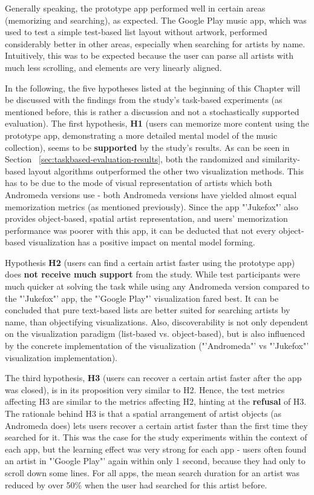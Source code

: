 Generally speaking, the prototype app performed well in certain areas (memorizing and searching), as expected. The Google Play music app, which was used to test a simple test-based list layout without artwork, performed considerably better in other areas, especially when searching for artists by name. Intuitively, this was to be expected because the user can parse all artists with much less scrolling, and elements are very linearly aligned.

In the following, the five hypotheses listed at the beginning of this Chapter will be discussed with the findings from the study's task-based experiments (as mentioned before, this is rather a discussion and not a stochastically supported evaluation).
The first hypothesis, \textbf{H1} (users can memorize more content using the prototype app, demonstrating a more detailed mental model of the music collection), seems to be \textbf{supported} by the study's results. As can be seen in Section ~\ref{sec:taskbased-evaluation-results}, both the randomized and similarity-based layout algorithms outperformed the other two visualization methods. This has to be due to the mode of visual representation of artists which both Andromeda versions use - both Andromeda versions have yielded almost equal memorization metrics (as mentioned previously). Since the app "'Jukefox"' also provides object-based, spatial artist representation, and users' memorization performance was poorer with this app, it can be deducted that not every object-based visualization has a positive impact on mental model forming.

Hypothesis \textbf{H2} (users can find a certain artist faster using the prototype app) does \textbf{not receive much support} from the study. While test participants were much quicker at solving the task while using any Andromeda version compared to the "'Jukefox"' app, the "'Google Play"' visualization fared best. It can be concluded that pure text-based lists are better suited for searching artists by name, than objectifying visualizations. Also, discoverability is not only dependent on the visualization paradigm (list-based vs. object-based), but is also influenced by the concrete implementation of the visualization ("'Andromeda"' vs "'Jukefox"' visualization implementation).
 
The third hypothesis, \textbf{H3} (users can recover a certain artist faster after the app was closed), is in its proposition very similar to H2. Hence, the test metrics affecting H3 are similar to the metrics affecting H2, hinting at the \textbf{refusal} of H3. The rationale behind H3 is that a spatial arrangement of artist objects (as Andromeda does) lets users recover a certain artist faster than the first time they searched for it. This was the case for the study experiments within the context of each app, but the learning effect was very strong for each app - users often found an artist in "'Google Play"' again within only 1 second, because they had only to scroll down some lines. For all apps, the mean search duration for an artist was reduced by over 50\% when the user had searched for this artist before.

